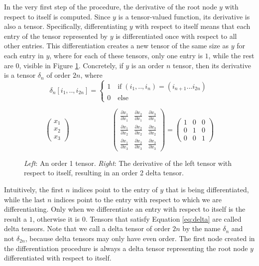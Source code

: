\documentclass[12pt, a4paper]{report}
\begin{document}
In the very first step of the procedure, the derivative of the root node $y$ with respect to itself is computed.
Since $y$ is a tensor-valued function, its derivative is also a tensor.
Specifically, differentiating $y$ with respect to itself means that each entry of the tensor represented by $y$ is differentiated once with respect to all other entries.
This differentiation creates a new tensor of the same size as $y$ for each entry in $y$, where for each of these tensors, only one entry is $1$, while the rest are $0$, visible in Figure \ref{fig:delta}.
Concretely, if $y$ is an order $n$ tensor, then its derivative is a tensor $\delta_n$ of order $2n$, where
\begin{equation}
    \delta_n[i_1,..,i_{2n}] = 
    \begin{cases}
        1 \quad \text{if} \; (i_1,..,i_n) = (i_{n+1}...i_{2n}) \\
        0 \quad \text{else}
    \end{cases}
    \label{eq:delta}
\end{equation}
\begin{figure}
    $$
    \begin{pmatrix}
        x_1\\
        x_2\\
        x_3
    \end{pmatrix} \quad \quad \quad \quad \quad \quad
    \begin{pmatrix}
        \frac{\partial x_1}{\partial x_1} & \frac{\partial x_2}{\partial x_1} & \frac{\partial x_3}{\partial x_1} \\
        \frac{\partial x_1}{\partial x_2} & \frac{\partial x_2}{\partial x_2} & \frac{\partial x_3}{\partial x_2} \\
        \frac{\partial x_1}{\partial x_3} & \frac{\partial x_2}{\partial x_3} & \frac{\partial x_3}{\partial x_3}
    \end{pmatrix}
    =
    \begin{pmatrix}
        1 & 0 & 0 \\
        0 & 1 & 0 \\
        0 & 0 & 1
    \end{pmatrix}
    $$
    \caption[Example of a Delta Tensor in a Differentiation DAG]{\textit{Left}: An order 1 tensor. \textit{Right}: The derivative of the left tensor with respect to itself, resulting in an order 2 delta tensor.}
    \label{fig:delta}
\end{figure}

Intuitively, the first $n$ indices point to the entry of $y$ that is being differentiated, while the last $n$ indices point to the entry with respect to which we are differentiating.
Only when we differentiate an entry with respect to itself is the result a $1$, otherwise it is $0$.
Tensors that satisfy Equation \ref{eq:delta} are called delta tensors.
Note that we call a delta tensor of order $2n$ by the name $\delta_n$ and not $\delta_{2n}$, because delta tensors may only have even order.
The first node created in the differentiation procedure is always a delta tensor representing the root node $y$ differentiated with respect to itself.
\end{document}
